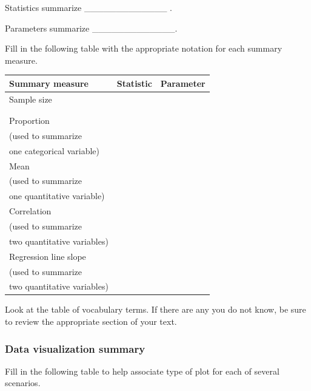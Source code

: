 \documentclass[
]{report}
\begin{document}
Statistics summarize \_\_\_\_\_\_\_\_\_\_\_\_\_ .

Parameters summarize \_\_\_\_\_\_\_\_\_\_\_\_\_.

Fill in the following table with the appropriate notation for each summary measure.

\begin{center}
\begin{tabular}{|l|p{2in}|p{2in}|}\hline
Summary measure & Statistic & Parameter \\ \hline
Sample size & & \\ 
& & \\ 
& & \\ \hline
Proportion & & \\ 
(used to summarize & & \\ 
one categorical variable) & & \\ \hline
Mean & & \\ 
(used to summarize & & \\ 
one quantitative variable)& & \\ \hline
Correlation & & \\ 
(used to summarize & & \\ 
two quantitative variables)& & \\ \hline
Regression line slope & & \\ 
(used to summarize & & \\ 
two quantitative variables)& & \\ \hline
\end{tabular}
\end{center}

Look at the table of vocabulary terms. If there are any you do not know, be sure to review the appropriate section of your text.

\hypertarget{data-visualization-summary}{%
\subsubsection*{Data visualization summary}\label{data-visualization-summary}}

Fill in the following table to help associate type of plot for each of several scenarios.
\end{document}
